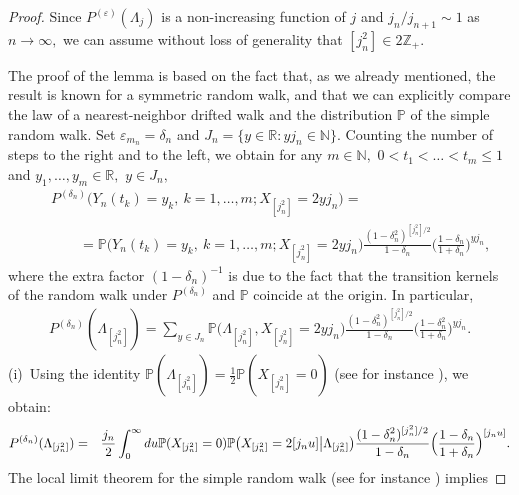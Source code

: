 \documentclass[12pt]{amsart}
\begin{document}
\begin{proof}
Since $P^{({\varepsilon})}(\Lambda_{j})$ is a non-increasing function of $j$ and
$j_n/j_{n+1}\sim 1$ as $n\to\infty,$ we can assume without loss of
generality that $[j_n^2]\in 2{{\mathbb Z}}_+$.
\par
The proof of the lemma is based on the fact that, as we already
mentioned, the result is known for a symmetric random walk, and that
we can explicitly compare the law of a nearest-neighbor drifted walk
and the distribution $\mathbb{P}$ of the simple random walk. Set
${\varepsilon}_{m_n}=\delta_n$ and $J_n=\{y\in {{\mathbb R}}: yj_n\in{{\mathbb N}}\}.$ Counting
the number of steps to the right and to the left, we obtain for any
$m\in {{\mathbb N}},$ $0 <t_1<\ldots <t_m \leq1$ and $y_1,\ldots, y_m \in
{{\mathbb R}},$ $y\in J_n,$ \begin{eqnarray} \nonumber && P^{(\delta_n)}\bigl(
Y_n(t_k)=y_k,~k=1,\ldots,m;X_{[j_n^2]}=2yj_n\bigr) = \\
\label{radon} && \qquad ={{\mathbb P}}\bigl( Y_n(t_k)=y_k,~k=1,\ldots,m;
X_{[j_n^2]}=2yj_n\bigr) {\frac {\displaystyle {(1-\delta_n^2)^{[j_n^2]/2}
}}{\displaystyle {1-\delta_n} }} \Bigr(\frac{1-\delta_n}{1+\delta_n}\Bigr)^{yj_n},
\end{eqnarray} where the extra factor $(1-\delta_n)^{-1}$ is due to the fact
that the transition kernels of the random walk under
$P^{(\delta_n)}$ and ${{\mathbb P}}$ coincide at the origin. In particular,
\begin{eqnarray*} P^{(\delta_n)}(\Lambda_{[j_n^2]}) = \!\!\sum_{y\in J_n} \!\!
{{\mathbb P}}\bigl( \Lambda_{[j_n^2]}, X_{[j_n^2]}=2y j_n\bigr)
{\frac {\displaystyle {(1-\delta_n^2)^{[j_n^2]/2} }}{\displaystyle {1-\delta_n} }}
\Bigr(\frac{1-\delta_n^2}{1+\delta_n}\Bigr)^{yj_n}.\end{eqnarray*} $\mbox{}$
\\ (i)~Using the identity ${{\mathbb P}}(
\Lambda_{[j_n^2]}) = {\frac {\displaystyle {1}}{\displaystyle {2} }} {{\mathbb P}}(X_{[j_n^2]}=0)$ (see for instance \cite[p. 198]{durrett}), we obtain:
\begin{eqnarray*}
P^{(\delta_n)}(\Lambda_{[j_n^2]})&=&
{\frac {\displaystyle {j_n}}{\displaystyle {2} }}\int_0^{\infty} du{{\mathbb P}}
(X_{[j_n^2]}=0) {{\mathbb P}}\bigl(X_{[j_n^2]}=2[j_n u]
\bigl| \Lambda_{[j_n^2]}\bigr) {\frac {\displaystyle {(1-\delta_n^2)^{[j_n^2]/2}}}{\displaystyle {1-\delta_n} }}
\Bigl({\frac {\displaystyle {1-\delta_n}}{\displaystyle {1+\delta_n} }}\Bigr)^{[j_n u]}.
\end{eqnarray*}
The local limit theorem for the simple random walk (see for instance \cite[p. 199]{durrett}) implies

\end{proof}
\end{document}

